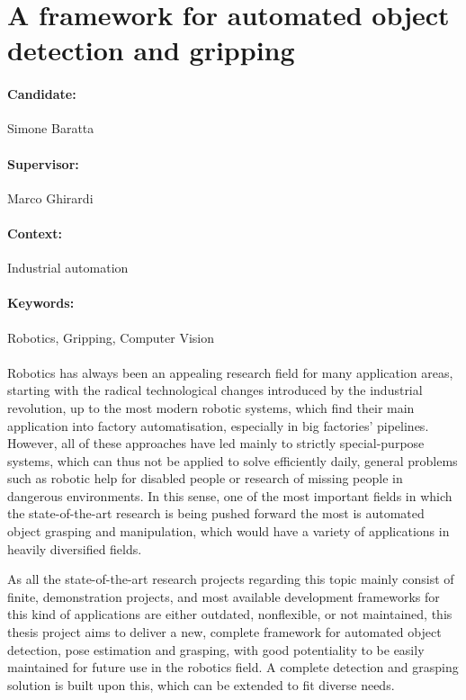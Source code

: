 \documentclass[a4paper,11pt]{article}
\begin{document}
\section*{A framework for automated object detection and gripping}
\paragraph{Candidate:} Simone Baratta
\paragraph{Supervisor:} Marco Ghirardi
\paragraph{Context:} Industrial automation
\paragraph{Keywords:} Robotics, Gripping, Computer Vision
\paragraph{}
Robotics has always been an appealing research field for many
application areas, starting with the radical technological changes
introduced by the industrial revolution, up to the most modern
robotic systems, which find their main application into factory
automatisation, especially in big factories' pipelines. However, all
of these approaches have led mainly to strictly special-purpose
systems, which can thus not be applied to solve efficiently daily, general problems such as
robotic help for disabled people or research of missing people in
dangerous environments. In this sense, one of the most important
fields in which the state-of-the-art research is being pushed forward
the most is automated object grasping and manipulation, which would have
a variety of applications in heavily diversified fields.

As all the state-of-the-art research projects regarding this topic  mainly
consist of finite, demonstration projects, and most available
development frameworks for this kind of applications are either
outdated, nonflexible, or not maintained, this thesis project aims to
deliver a new, complete framework for automated object detection, pose
estimation and grasping, with good potentiality to be easily maintained for
future use in the robotics field. A complete detection and grasping solution is
built upon this, which can be extended to fit diverse needs.
\end{document}
